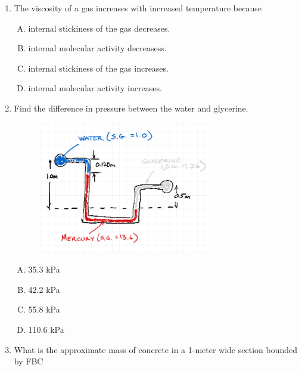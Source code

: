 \documentclass[12pt]{article}
\begin{document}
\begin{enumerate}
\item The viscosity of a gas increases with increased temperature because

\begin{enumerate}[A)]
\item internal stickiness of the gas decreases.
\item internal molecular activity decreasess.
\item internal stickiness of the gas increases.
\item internal molecular activity increases.
\end{enumerate}


\item Find the difference in pressure between the water and glycerine. 

\begin{figure}[htbp] %
   \centering
   \includegraphics[width=3in]{manometerTwo.png} 
   \caption{}
   \label{fig:manometer}
\end{figure}

\begin{enumerate}[A)]
\item 35.3 kPa
\item 42.2 kPa
\item 55.8 kPa
\item 110.6 kPa
\end{enumerate}
\clearpage

\item What is the approximate mass of concrete in a 1-meter wide section bounded by FBC


\end{enumerate}
\end{document}
